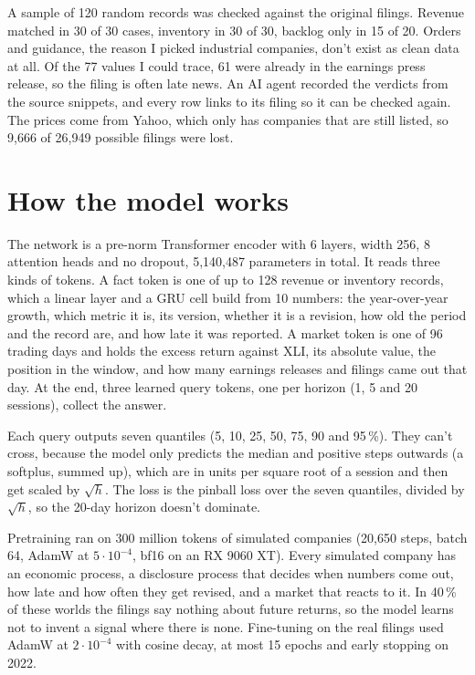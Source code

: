 \documentclass[11pt,a4paper]{article}
\begin{document}
A sample of 120 random records was checked against the original filings. Revenue matched in 30 of 30 cases, inventory in 30 of 30, backlog only in 15 of 20. Orders and guidance, the reason I picked industrial companies, don't exist as clean data at all. Of the 77 values I could trace, 61 were already in the earnings press release, so the filing is often late news. An AI agent recorded the verdicts from the source snippets, and every row links to its filing so it can be checked again. The prices come from Yahoo, which only has companies that are still listed, so 9,666 of 26,949 possible filings were lost.

\section*{How the model works}

The network is a pre-norm Transformer encoder with 6 layers, width 256, 8 attention heads and no dropout, 5,140,487 parameters in total. It reads three kinds of tokens. A fact token is one of up to 128 revenue or inventory records, which a linear layer and a GRU cell build from 10 numbers: the year-over-year growth, which metric it is, its version, whether it is a revision, how old the period and the record are, and how late it was reported. A market token is one of 96 trading days and holds the excess return against XLI, its absolute value, the position in the window, and how many earnings releases and filings came out that day. At the end, three learned query tokens, one per horizon (1, 5 and 20 sessions), collect the answer.

Each query outputs seven quantiles (5, 10, 25, 50, 75, 90 and 95\,\%). They can't cross, because the model only predicts the median and positive steps outwards (a softplus, summed up), which are in units per square root of a session and then get scaled by $\sqrt{h}$. The loss is the pinball loss over the seven quantiles, divided by $\sqrt{h}$, so the 20-day horizon doesn't dominate.

Pretraining ran on 300 million tokens of simulated companies (20,650 steps, batch 64, AdamW at $5\cdot10^{-4}$, bf16 on an RX 9060 XT). Every simulated company has an economic process, a disclosure process that decides when numbers come out, how late and how often they get revised, and a market that reacts to it. In 40\,\% of these worlds the filings say nothing about future returns, so the model learns not to invent a signal where there is none. Fine-tuning on the real filings used AdamW at $2\cdot10^{-4}$ with cosine decay, at most 15 epochs and early stopping on 2022.
\end{document}
